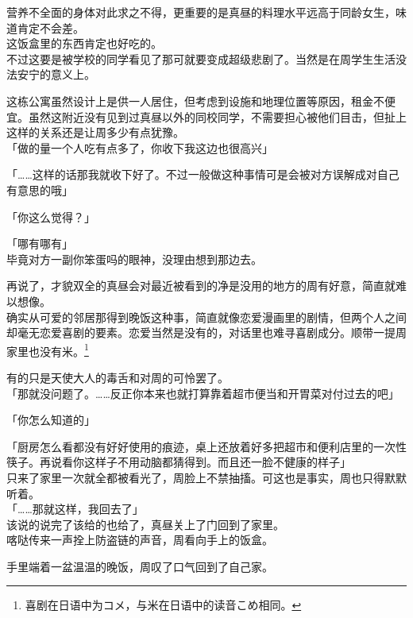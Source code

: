 营养不全面的身体对此求之不得，更重要的是真昼的料理水平远高于同龄女生，味道肯定不会差。\\

这饭盒里的东西肯定也好吃的。\\

不过这要是被学校的同学看见了那可就要变成超级悲剧了。当然是在周学生生活没法安宁的意义上。

这栋公寓虽然设计上是供一人居住，但考虑到设施和地理位置等原因，租金不便宜。虽然这附近没有见到过真昼以外的同校同学，不需要担心被他们目击，但扯上这样的关系还是让周多少有点犹豫。\\

「做的量一个人吃有点多了，你收下我这边也很高兴」

「……这样的话那我就收下好了。不过一般做这种事情可是会被对方误解成对自己有意思的哦」

「你这么觉得？」

「哪有哪有」\\

毕竟对方一副你笨蛋吗的眼神，没理由想到那边去。

再说了，才貌双全的真昼会对最近被看到的净是没用的地方的周有好意，简直就难以想像。\\

确实从可爱的邻居那得到晚饭这种事，简直就像恋爱漫画里的剧情，但两个人之间却毫无恋爱喜剧的要素。恋爱当然是没有的，对话里也难寻喜剧成分。顺带一提周家里也没有米。\footnote{喜剧在日语中为{\jpfont コメ}，与米在日语中的读音{\jpfont こめ}相同。}

有的只是天使大人的毒舌和对周的可怜罢了。\\

「那就没问题了。……反正你本来也就打算靠着超市便当和开胃菜对付过去的吧」

「你怎么知道的」

「厨房怎么看都没有好好使用的痕迹，桌上还放着好多把超市和便利店里的一次性筷子。再说看你这样子不用动脑都猜得到。而且还一脸不健康的样子」\\

只来了家里一次就全都被看光了，周脸上不禁抽搐。可这也是事实，周也只得默默听着。\\

「……那就这样，我回去了」\\

该说的说完了该给的也给了，真昼关上了门回到了家里。\\

喀哒传来一声拴上防盗链的声音，周看向手上的饭盒。

手里端着一盆温温的晚饭，周叹了口气回到了自己家。\\


